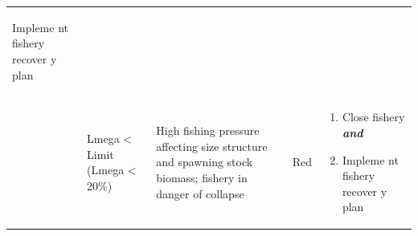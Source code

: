 \documentclass[]{book}
\begin{document}
\begin{longtable}[]{@{}lllll@{}}
\begin{minipage}[t]{0.19\columnwidth}
\begin{enumerate}
  Impleme nt fishery recover y plan
\end{enumerate}\strut
\end{minipage}\tabularnewline
\begin{minipage}[t]{0.19\columnwidth}\raggedright\strut
\strut
\end{minipage} & \begin{minipage}[t]{0.19\columnwidth}\raggedright\strut
Lmega \textless{} Limit (Lmega \textless{} 20\%)\strut
\end{minipage} & \begin{minipage}[t]{0.19\columnwidth}\raggedright\strut
High fishing pressure affecting size structure and spawning stock
biomass; fishery in danger of collapse\strut
\end{minipage} & \begin{minipage}[t]{0.19\columnwidth}\raggedright\strut
Red\strut
\end{minipage} & \begin{minipage}[t]{0.19\columnwidth}\raggedright\strut
\begin{enumerate}
\def\labelenumi{\arabic{enumi}.}
\item
  Close fishery \textbf{\emph{and} }
\item
  Impleme nt fishery recover y plan
\end{enumerate}\strut
\end{minipage}\tabularnewline
\bottomrule
\end{longtable}
\end{document}
